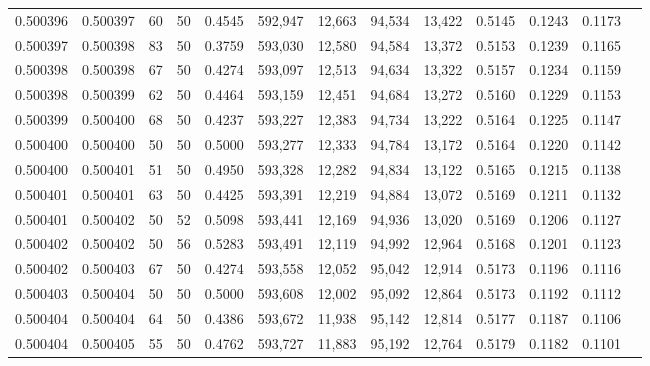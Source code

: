 \begin{tabular}{rrrrrrrrrrrrr}
0.500396 & 0.500397 &    60 &  50 &                                     0.4545 & 592,947 &  12,663 &  94,534 &  13,422 & 0.5145 & 0.1243 & 0.1173 \\
0.500397 & 0.500398 &    83 &  50 &                                     0.3759 & 593,030 &  12,580 &  94,584 &  13,372 & 0.5153 & 0.1239 & 0.1165 \\
0.500398 & 0.500398 &    67 &  50 &                                     0.4274 & 593,097 &  12,513 &  94,634 &  13,322 & 0.5157 & 0.1234 & 0.1159 \\
0.500398 & 0.500399 &    62 &  50 &                                     0.4464 & 593,159 &  12,451 &  94,684 &  13,272 & 0.5160 & 0.1229 & 0.1153 \\
0.500399 & 0.500400 &    68 &  50 &                                     0.4237 & 593,227 &  12,383 &  94,734 &  13,222 & 0.5164 & 0.1225 & 0.1147 \\
0.500400 & 0.500400 &    50 &  50 &                                     0.5000 & 593,277 &  12,333 &  94,784 &  13,172 & 0.5164 & 0.1220 & 0.1142 \\
0.500400 & 0.500401 &    51 &  50 &                                     0.4950 & 593,328 &  12,282 &  94,834 &  13,122 & 0.5165 & 0.1215 & 0.1138 \\
0.500401 & 0.500401 &    63 &  50 &                                     0.4425 & 593,391 &  12,219 &  94,884 &  13,072 & 0.5169 & 0.1211 & 0.1132 \\
0.500401 & 0.500402 &    50 &  52 &                                     0.5098 & 593,441 &  12,169 &  94,936 &  13,020 & 0.5169 & 0.1206 & 0.1127 \\
0.500402 & 0.500402 &    50 &  56 &                                     0.5283 & 593,491 &  12,119 &  94,992 &  12,964 & 0.5168 & 0.1201 & 0.1123 \\
0.500402 & 0.500403 &    67 &  50 &                                     0.4274 & 593,558 &  12,052 &  95,042 &  12,914 & 0.5173 & 0.1196 & 0.1116 \\
0.500403 & 0.500404 &    50 &  50 &                                     0.5000 & 593,608 &  12,002 &  95,092 &  12,864 & 0.5173 & 0.1192 & 0.1112 \\
0.500404 & 0.500404 &    64 &  50 &                                     0.4386 & 593,672 &  11,938 &  95,142 &  12,814 & 0.5177 & 0.1187 & 0.1106 \\
0.500404 & 0.500405 &    55 &  50 &                                     0.4762 & 593,727 &  11,883 &  95,192 &  12,764 & 0.5179 & 0.1182 & 0.1101 \\

\end{tabular}
